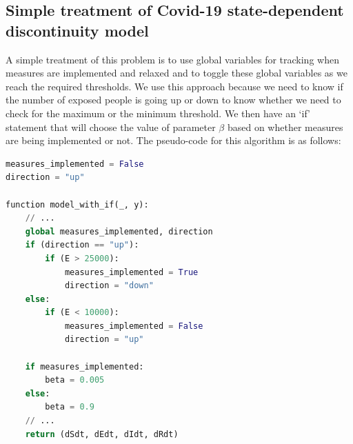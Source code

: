 \subsection{Simple treatment of Covid-19 state-dependent discontinuity model}
\label{subsection:naive_state_problem}
A simple treatment of this problem is to use global variables for tracking when measures are implemented and relaxed and to toggle these global variables as we reach the required thresholds. We use this approach because we need to know if the number of exposed people is going up or down to know whether we need to check for the maximum or the minimum threshold. We then have an `if' statement that will choose the value of parameter $\beta$ based on whether measures are being implemented or not. The pseudo-code for this algorithm is as follows:

\begin{minipage}{\linewidth}
\begin{lstlisting}[language=Python]
measures_implemented = False
direction = "up"

function model_with_if(_, y):
    // ...
    global measures_implemented, direction
    if (direction == "up"):
        if (E > 25000):
            measures_implemented = True
            direction = "down"
    else:
        if (E < 10000):
            measures_implemented = False
            direction = "up"

    if measures_implemented:
        beta = 0.005 
    else:
        beta = 0.9
    // ...
    return (dSdt, dEdt, dIdt, dRdt)
\end{lstlisting}
\end{minipage}


